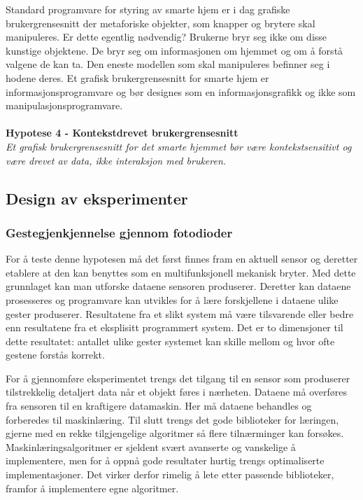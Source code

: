Standard programvare for styring av smarte hjem er i dag grafiske brukergrensesnitt der metaforiske objekter, som knapper og brytere skal manipuleres. Er dette egentlig nødvendig? Brukerne bryr seg ikke om disse kunstige objektene. De bryr seg om informasjonen om hjemmet og om å forstå valgene de kan ta. Den eneste modellen som skal manipuleres befinner seg i hodene deres. Et grafisk brukergrensesnitt for smarte hjem er informasjonsprogramvare og bør designes som en informasjonsgrafikk og ikke som manipulasjonsprogramvare.\\\\
\textbf{Hypotese 4 - Kontekstdrevet brukergrensesnitt}\\
\emph{Et grafisk brukergrensesnitt for det smarte hjemmet bør være kontekstsensitivt og være drevet av data, ikke interaksjon med brukeren.}\\

\subsection{Design av eksperimenter}

\subsubsection*{Gestegjenkjennelse gjennom fotodioder}
For å teste denne hypotesen må det først finnes fram en aktuell sensor og deretter etablere at den kan benyttes som en multifunksjonell mekanisk bryter. Med dette grunnlaget kan man utforske dataene sensoren produserer. Deretter kan dataene prosesseres og programvare kan utvikles for å lære forskjellene i dataene ulike gester produserer. Resultatene fra et slikt system må være tilsvarende eller bedre enn resultatene fra et eksplisitt programmert system. Det er to dimensjoner til dette resultatet: antallet ulike gester systemet kan skille mellom og hvor ofte gestene forstås korrekt.

For å gjennomføre eksperimentet trengs det tilgang til en sensor som produserer tilstrekkelig detaljert data når et objekt føres i nærheten. Dataene må overføres fra sensoren til en kraftigere datamaskin. Her må dataene behandles og forberedes til maskinlæring. Til slutt trengs det gode biblioteker for læringen, gjerne med en rekke tilgjengelige algoritmer så flere tilnærminger kan forsøkes. Maskinlæringsalgoritmer er sjeldent svært avanserte og vanskelige å implementere, men for å oppnå gode resultater hurtig trengs optimaliserte implementasjoner. Det virker derfor rimelig å lete etter passende biblioteker, framfor å implementere egne algoritmer.

